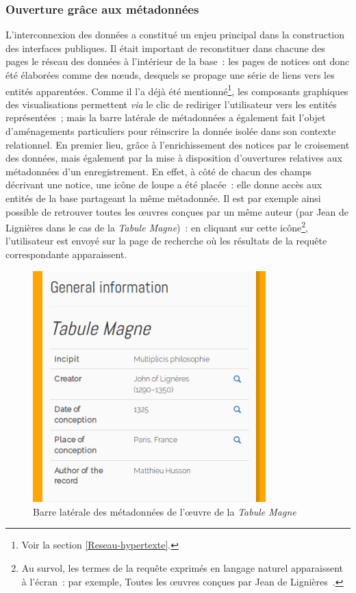 \documentclass[a4paper,12pt,twoside]{book}
\newcommand{\eng}{\emph}
\newcommand{\g}[1]{\og#1~\fg}
\begin{document}
			\subsubsection{\label{OuvrirMeta}Ouverture grâce aux métadonnées}
L'interconnexion des données a constitué un enjeu principal dans la construction des interfaces publiques. Il était important de reconstituer dans chacune des pages le réseau des données à l'intérieur de la base~: les pages de notices ont donc été élaborées comme des nœuds, desquels se propage une série de liens vers les entités apparentées. Comme il l'a déjà été mentionné\footnote{Voir la section \ref{Reseau-hypertexte}.}, les composants graphiques des visualisations permettent \eng{via} le clic de rediriger l'utilisateur vers les entités représentées~; mais la barre latérale de métadonnées a également fait l'objet d'aménagements particuliers pour réinscrire la donnée isolée dans son contexte relationnel. En premier lieu, grâce à l'enrichissement des notices par le croisement des données, mais également par la mise à disposition d'ouvertures relatives aux métadonnées d'un enregistrement. En effet, à côté de chacun des champs décrivant une notice, une icône de loupe a été placée~: elle donne accès aux entités de la base partageant la même métadonnée. Il est par exemple ainsi possible de retrouver toutes les œuvres conçues par un même auteur (par Jean de Lignières dans le cas de la \emph{Tabule Magne})~: en cliquant sur cette icône\footnote{Au survol, les termes de la requête exprimés en langage naturel apparaissent à l'écran~: par exemple, \g{Toutes les œuvres conçues par Jean de Lignières}.}, l'utilisateur est envoyé sur la page de recherche où les résultats de la requête correspondante apparaissent.

\begin{figure}[h!]
	\centering
	\includegraphics[width=9cm]{Images/Sidebar/metadata-work.png}
	\caption{Barre latérale des métadonnées de l'œuvre de la \emph{Tabule Magne}}
\end{figure} 
\end{document}
